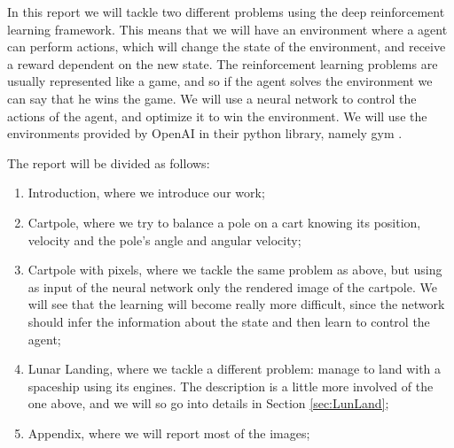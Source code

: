 In this report we will tackle two different problems using the deep reinforcement learning framework. This means that we will
have an environment where a agent can perform actions, which will change the state of the environment, and receive 
a reward dependent on the new state. The reinforcement learning
problems are usually represented like a game, and so if the agent solves the environment we can say that he wins the game. We will
use a neural network to control the actions of the agent, and optimize it to win the environment. We will use the environments provided
by OpenAI in their python library, namely gym \cite{gym}.

The report will be divided as follows:
\begin{enumerate}
    \item Introduction, where we introduce our work;
    \item Cartpole, where we try to balance a pole on a cart knowing its position, velocity and the pole's angle and angular velocity;
    \item Cartpole with pixels, where we tackle the same problem as above, but using as input of the neural network only the rendered image of the cartpole. We will 
        see that the learning will become really more difficult, since the network should infer the information about the state and then learn to control
        the agent;
    \item Lunar Landing, where we tackle a different problem: manage to land with a spaceship using its engines. The description is a little more 
        involved of the one above, and we will so go into details in Section \ref{sec:LunLand};
    \item Appendix, where we will report most of the images;
\end{enumerate}